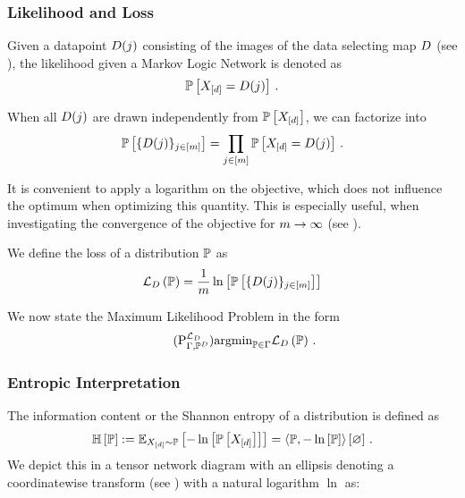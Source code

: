 \subsubsection{Likelihood and Loss}

Given a datapoint $D(j)$ consisting of the images of the data selecting map $D$ (see ), the likelihood given a Markov Logic Network is denoted as
	\[ \mathbb{P}\left[X_{[d]} = D(j)\right] \, . \]
	
When all $D(j)$ are drawn independently from $\mathbb{P}\left[X_{[d]}\right]$, we can factorize into
	\[ \mathbb{P}\left[\{D(j)\}_{j\in[m]}\right]  = \prod_{j\in[m]} \mathbb{P}\left[X_{[d]}=D(j)\right] \, . \]

It is convenient to apply a logarithm on the objective, which does not influence the optimum when optimizing this quantity.
This is especially useful, when investigating the convergence of the objective for $m\rightarrow\infty$ (see ).

\begin{definition}\label{def:loss}
	We define the loss of a distribution $\mathbb{P}$ as
	\begin{align*}%
		\lossof{\probtensor} 
		= \frac{1}{\datanum} \lnof{\probof{\data}} 
	\end{align*}
\end{definition}

We now state the Maximum Likelihood Problem in the form
\begin{align}\tag{$\probtagtypeinst{\loss}{\Gamma,\empdistribution}$}\label{prob:parameterMaxLikelihood}
	\argmin_{\probtensor\in\Gamma} \lossof{\probtensor} \, . %
\end{align}



\subsubsection{Entropic Interpretation}



\begin{definition}
	The information content or the Shannon entropy of a distribution is defined as
		\[ \mathbb{H}\left[\mathbb{P}\right] 
		:= \mathbb{E}_{X_{[d]}\sim\mathbb{P}}\left[-\ln \left[ \mathbb{P}\left[X_{[d]}\right] \right]\right] 
		= \left\langle \mathbb{P},-\ln \left[ \mathbb{P} \right]\right\rangle \left[ \varnothing \right] \, . \]
	We depict this in a tensor network diagram with an ellipsis denoting a coordinatewise transform (see ) with a natural logarithm $\ln$ as:
	\begin{center}
		
	\end{center}
\end{definition}

